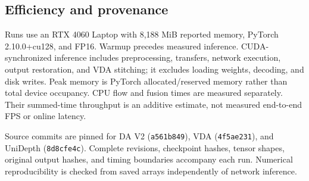 \subsection{Efficiency and provenance}
Runs use an RTX 4060 Laptop with 8,188 MiB reported memory, PyTorch 2.10.0+cu128, and FP16. Warmup precedes measured inference. CUDA-synchronized inference includes preprocessing, transfers, network execution, output restoration, and VDA stitching; it excludes loading weights, decoding, and disk writes. Peak memory is PyTorch allocated/reserved memory rather than total device occupancy. CPU flow and fusion times are measured separately. Their summed-time throughput is an additive estimate, not measured end-to-end FPS or online latency.

Source commits are pinned for DA V2 (\texttt{a561b849}), VDA (\texttt{4f5ae231}), and UniDepth (\texttt{8d8cfe4c}). Complete revisions, checkpoint hashes, tensor shapes, original output hashes, and timing boundaries accompany each run. Numerical reproducibility is checked from saved arrays independently of network inference.
